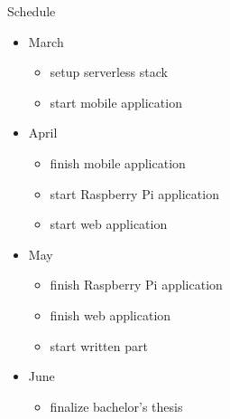 \documentclass[aspectratio=1610]{beamer}
\begin{document}
  \begin{frame}{Schedule}
    \begin{itemize}
      \item March
        \begin{itemize}
          \item setup serverless stack
          \item start mobile application
        \end{itemize}
      \item April
        \begin{itemize}
          \item finish mobile application
          \item start Raspberry Pi application
          \item start web application
        \end{itemize}
      \item May
        \begin{itemize}
          \item finish Raspberry Pi application
          \item finish web application
          \item start written part
        \end{itemize}
      \item June
        \begin{itemize}
          \item finalize bachelor’s thesis
        \end{itemize}
    \end{itemize}
  \end{frame}
\end{document}
